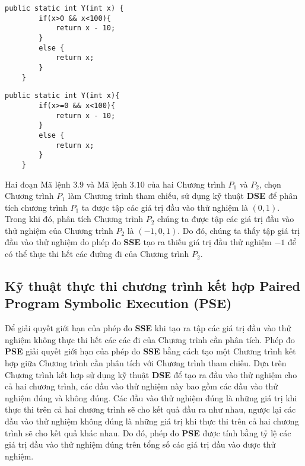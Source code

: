 \begin{minipage}[t]{0.45\linewidth}
	\begin{lstlisting}[caption={Chương trình $P_{1}$}, label={Script}]
	public static int Y(int x) {
	    if(x>0 && x<100){
            return x - 10;
	    }
	    else {
        	return x; 
	    }
    }
	\end{lstlisting}
\end{minipage}%
\hfill\vrule\hfill
\begin{minipage}[t]{0.45\linewidth}
	\begin{lstlisting}[caption={Chương trình $P_{2}$}, label={Script}]
	public static int Y(int x){
	    if(x>=0 && x<100){
        	return x - 10;
	    }
	    else {
        	return x; 
	    }
    }
	\end{lstlisting}
\end{minipage}%

Hai đoạn Mã lệnh $3.9$ và Mã lệnh $3.10$ của hai Chương trình $P_{1}$ và $P_{2}$, chọn Chương trình $P_{1}$ làm Chương trình tham chiếu, sử dụng kỹ thuật \textbf{DSE} để phân tích chương trình $P_{1}$ ta được tập các giá trị đầu vào thử nghiệm là ${(0, 1)}$. Trong khi đó, phân tích Chương trình $P_{2}$ chúng ta được tập các giá trị đầu vào thử nghiệm của Chương trình $P_{2}$  là ${(-1, 0, 1)}$. Do đó, chúng ta thấy tập giá trị đầu vào thử nghiệm do phép đo \textbf{SSE} tạo ra thiếu giá trị đầu thử nghiệm $-1$ để có thể thực thi hết các đường đi của Chương trình $P_{2}$.

\subsection{Kỹ thuật thực thi chương trình kết hợp Paired Program Symbolic Execution (PSE)}
Để giải quyết giới hạn của phép đo \textbf{SSE} khi tạo ra tập các giá trị đầu vào thử nghiệm không thực thi hết các các đi của Chương trình cần phân tích. Phép đo \textbf{PSE} giải quyết giới hạn của phép đo \textbf{SSE} bằng cách tạo một Chương trình kết hợp giữa Chương trình cần phân tích với Chương trình tham chiếu. Dựa trên Chương trình kết hợp sử dụng kỹ thuật \textbf{DSE} để tạo ra đầu vào thử nghiệm cho cả hai chương trình, các đầu vào thử nghiệm này bao gồm các đầu vào thử nghiệm đúng và không đúng. Các đầu vào thử nghiệm đúng là những giá trị khi thực thi trên cả hai chương trình sẽ cho kết quả đầu ra như nhau, ngược lại các đầu vào thử nghiệm không đúng là những giá trị khi thực thi trên cả hai chương trình sẽ cho kết quả khác nhau. Do đó, phép đo \textbf{PSE} được tính bằng tỷ lệ các giá trị đầu vào thử nghiệm đúng trên tổng số các giá trị đầu vào được thử nghiệm. 


